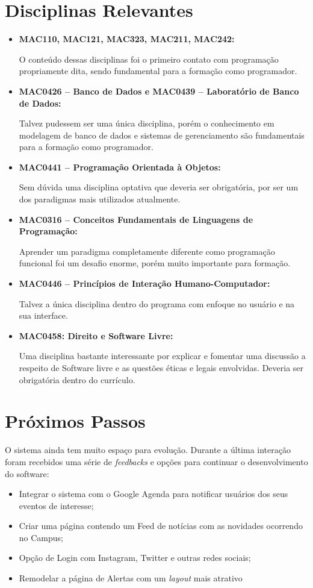 \section{Disciplinas Relevantes}
\begin{itemize}
\item\textbf{MAC110, MAC121, MAC323, MAC211, MAC242:}
\par O conteúdo dessas disciplinas foi o primeiro contato com programação propriamente dita, sendo fundamental para a formação como programador.
\item\textbf{MAC0426 – Banco de Dados e MAC0439 – Laboratório de Banco de Dados:}
\par Talvez pudessem ser uma única disciplina, porém o conhecimento em modelagem de banco de dados e sistemas de gerenciamento são fundamentais para a formação como programador.
\item\textbf{MAC0441 – Programação Orientada à Objetos:}
\par Sem dúvida uma disciplina optativa que deveria ser obrigatória, por ser um dos paradigmas mais utilizados atualmente.
\item\textbf{MAC0316 – Conceitos Fundamentais de Linguagens de Programação:}
\par Aprender um paradigma completamente diferente como programação funcional foi um desafio enorme, porém muito importante para formação.
\item\textbf{MAC0446 – Princípios de Interação Humano-Computador:}
\par Talvez a única disciplina dentro do programa com enfoque no usuário e na sua interface.
\item\textbf{MAC0458: Direito e Software Livre:}
\par Uma disciplina bastante interessante por explicar e fomentar uma discussão a respeito de Software livre e as questões éticas e legais envolvidas. Deveria ser obrigatória dentro do currículo.
\end{itemize}

\section{Próximos Passos}
\par O sistema ainda tem muito espaço para evolução. Durante a última interação foram recebidos uma série de \emph{feedbacks} e opções para continuar o desenvolvimento do software:
\begin{itemize}
\item{Integrar o sistema com o Google Agenda para notificar usuários dos seus eventos de interesse;}
\item{Criar uma página contendo um Feed de notícias com as novidades ocorrendo no Campus;}
\item{Opção de Login com Instagram, Twitter e outras redes sociais;}
\item{Remodelar a página de Alertas com um \emph{layout} mais atrativo}
\end{itemize}
